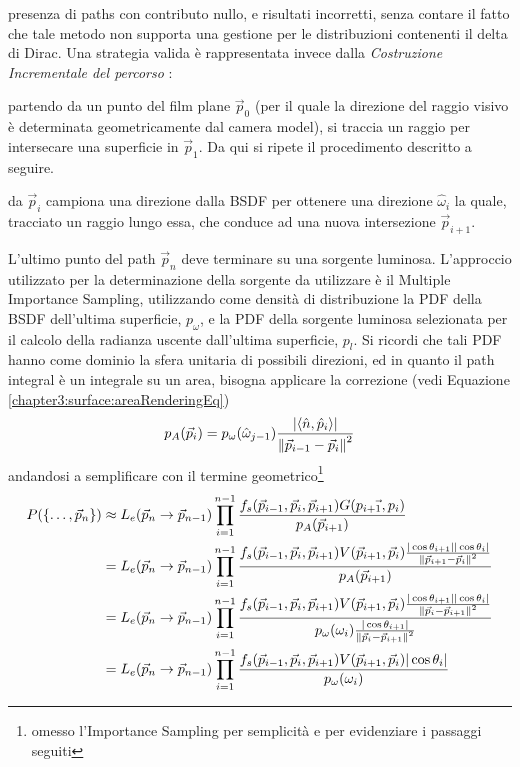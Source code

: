 presenza di paths con contributo nullo, e risultati incorretti, senza contare il fatto che tale metodo non supporta una gestione per le distribuzioni
contenenti il delta di Dirac. Una strategia valida \`e rappresentata invece dalla \textit{Costruzione Incrementale del percorso} \cite{pharr}:\par
partendo da un punto del film plane $\vec{p}_0$ (per il quale la direzione del raggio visivo \`e determinata geometricamente dal camera model),
si traccia un raggio per intersecare una superficie in $\vec{p}_1$. Da qui si ripete il procedimento descritto a seguire.\par
da $\vec{p}_i$ campiona una direzione dalla BSDF per ottenere una direzione $\hat{\omega}_i$ la quale, tracciato un raggio lungo essa, che conduce ad 
una nuova intersezione $\vec{p}_{i+1}$.\par
L'ultimo punto del path $\vec{p}_n$ deve terminare su una sorgente luminosa. L'approccio utilizzato per la determinazione della sorgente da utilizzare
\`e il Multiple Importance Sampling, utilizzando come densit\`a di distribuzione la PDF della BSDF dell'ultima superficie, $p_\omega$, e la PDF 
della sorgente luminosa selezionata per il calcolo della radianza uscente dall'ultima superficie, $p_l$. Si ricordi che tali PDF hanno come dominio
la sfera unitaria di possibili direzioni, ed 
in quanto il path integral \`e un integrale su un area, bisogna applicare la correzione (vedi Equazione \ref{chapter3:surface:areaRenderingEq})
\begin{equation}
	p_A(\vec{p}_i)=p_\omega(\hat{\omega}_{j-1})\frac{|\langle\hat{n},\hat{p}_i\rangle|}{\norm{\vec{p}_{i-1}-\vec{p}_i}^2}
\end{equation}
andandosi a semplificare con il termine geometrico\footnote{omesso l'Importance Sampling per semplicit\`a e per evidenziare i passaggi seguiti}
\begin{align}
	P(\{\ldots,\vec{p}_{n}\})&\approx L_e(\vec{p}_n\to\vec{p}_{n-1})\prod_{i=1}^{n-1}\frac{f_s(\vec{p}_{i-1},\vec{p}_i,\vec{p}_{i+1})G(\vec{p_{i+1},p_{i}})}
		{p_A(\vec{p}_{i+1})} \nonumber \\
	&=L_e(\vec{p}_n\to\vec{p}_{n-1})\prod_{i=1}^{n-1}\frac{f_s(\vec{p}_{i-1},\vec{p}_i,\vec{p}_{i+1})V(\vec{p}_{i+1},\vec{p}_i)
		\frac{|\cos\theta_{i+1}||\cos\theta_i|}{\norm{\vec{p}_{i+1}-\vec{p}_i}^2}}{p_A(\vec{p}_{i+1})} \nonumber \\
	&=L_e(\vec{p}_n\to\vec{p}_{n-1})\prod_{i=1}^{n-1}\frac{f_s(\vec{p}_{i-1},\vec{p}_i,\vec{p}_{i+1})V(\vec{p}_{i+1},\vec{p}_i)
		\frac{|\cos\theta_{i+1}||\cos\theta_i|}{\norm{\vec{p}_i-\vec{p}_{i+1}}^2}}
		{p_\omega(\omega_i)\frac{|\cos\theta_{i+1}|}{\norm{\vec{p}_i-\vec{p}_{i+1}}^2}} \nonumber \\
	&=L_e(\vec{p}_n\to\vec{p}_{n-1})\prod_{i=1}^{n-1}\frac{f_s(\vec{p}_{i-1},\vec{p}_i,\vec{p}_{i+1})V(\vec{p}_{i+1},\vec{p}_i)
		|\cos\theta_i|}{p_\omega(\omega_i)}
\end{align}
